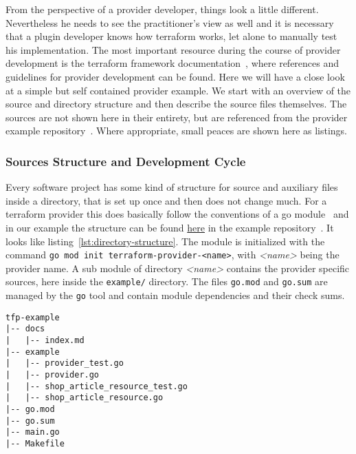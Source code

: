 \documentclass[paper=a4,11pt,numbers=noenddot]{article}
\begin{document}
From the perspective of a provider developer, things look a little different. Nevertheless he needs to see the practitioner's view as well and it is necessary that a plugin developer knows how terraform works, let alone to manually test his implementation. The most important resource during the course of provider development is the terraform framework documentation~\autocite{noauthor_terraform_framework_nodate}, where references and guidelines for provider development can be found. Here we will have a close look at a simple but self contained provider example. We start with an overview of the source and directory structure and then describe the source files themselves. The sources are not shown here in their entirety, but are referenced from the provider example repository~\autocite{ecky-l_terraform-provider-example_nodate}. Where appropriate, small peaces are shown here as listings.

\subsubsection{Sources Structure and Development Cycle}
\label{subsubsec:prov-sourc-struct}

Every software project has some kind of structure for source and auxiliary files inside a directory, that is set up once and then does not change much. For a terraform provider this does basically follow the conventions of a go module~\autocite{noauthor_go_modules_nodate} and in our example the structure can be found \href{https://github.com/ecky-l/terraform-provider-example/tree/main/src/tfp-example}{here} in the example repository~\autocite{ecky-l_terraform-provider-example_nodate}. It looks like listing~\ref{lst:directory-structure}. The module is initialized with the command \verb'go mod init terraform-provider-<name>', with \emph{<name>} being the provider name. A sub module of directory \emph{<name>} contains the provider specific sources, here inside the \verb'example/' directory. The files \verb'go.mod' and \verb'go.sum' are managed by the \verb'go' tool and contain module dependencies and their check sums.

\begin{lstlisting}[label=lst:directory-structure]
tfp-example
|-- docs
|   |-- index.md
|-- example
|   |-- provider_test.go
|   |-- provider.go
|   |-- shop_article_resource_test.go
|   |-- shop_article_resource.go
|-- go.mod
|-- go.sum
|-- main.go
|-- Makefile
\end{lstlisting}
\end{document}

